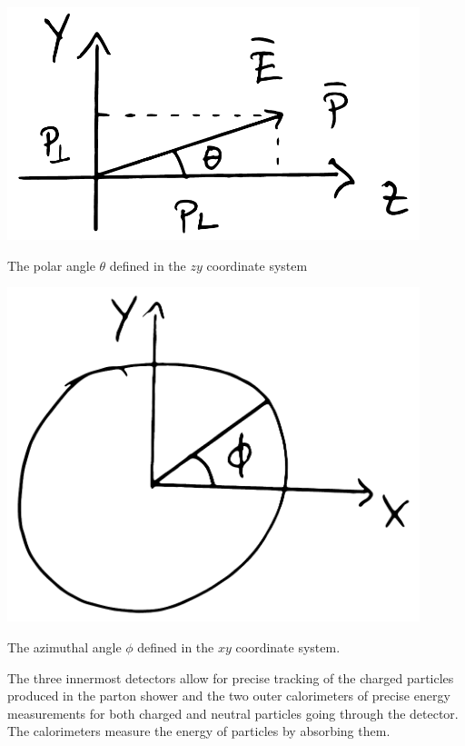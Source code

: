 \begin{marginfigure}
  \centerfloat
  \includegraphics[width=0.9\textwidth]{figures/yz_coordinate_system/yz_coords.pdf}
  \caption[Polar Angle]{The polar angle $\theta$ defined in the $zy$ coordinate system}
  \label{fig:hep:aleph_detector_theta}
\end{marginfigure}
\begin{marginfigure}
  \centerfloat
  \includegraphics[width=0.9\textwidth]{figures/xy_coordinate_system/xy_coords.pdf}
  \caption[Azimuthal Angle]{The azimuthal angle $\phi$ defined in the $xy$ coordinate system. }
  \label{fig:hep:aleph_detector_phi}
\end{marginfigure}

The three innermost detectors allow for precise tracking of the charged particles produced in the parton shower and the two outer calorimeters of precise energy measurements for both charged and neutral particles going through the detector. The calorimeters measure the energy of particles by absorbing them. 


